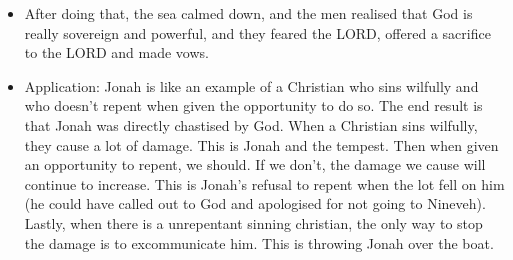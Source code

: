 \begin{itemize}
  \item{After doing that, the sea calmed down, and the men realised that God is really sovereign and powerful, and they feared the LORD, offered a sacrifice to the LORD and made vows.}
  \item{Application: Jonah is like an example of a Christian who sins wilfully and who doesn’t repent when given the opportunity to do so. The end result is that Jonah was directly chastised by God. When a Christian sins wilfully, they cause a lot of damage. This is Jonah and the tempest. Then when given an opportunity to repent, we should. If we don’t, the damage we cause will continue to increase. This is Jonah’s refusal to repent when the lot fell on him (he could have called out to God and apologised for not going to Nineveh). Lastly, when there is a unrepentant sinning christian, the only way to stop the damage is to excommunicate him. This is throwing Jonah over the boat. }
\end{itemize}